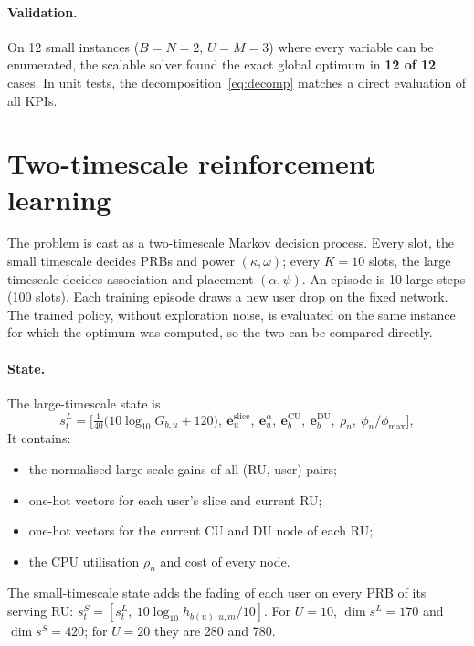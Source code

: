 \documentclass[11pt,oneside]{report}
\begin{document}
\paragraph{Validation.}
On 12 small instances ($B=N=2$, $U=M=3$) where every variable can be enumerated, the scalable solver found the exact global optimum in \textbf{12 of 12} cases.
In unit tests, the decomposition~\eqref{eq:decomp} matches a direct evaluation of all KPIs.

\section{Two-timescale reinforcement learning}\label{sec:rl}
The problem is cast as a two-timescale Markov decision process. Every slot, the small timescale decides PRBs and power $(\kappa,\omega)$; every $K=10$ slots, the large timescale decides association and placement $(\alpha,\psi)$.
An episode is 10 large steps (100 slots).
Each training episode draws a new user drop on the fixed network.
The trained policy, without exploration noise, is evaluated on the same instance for which the optimum was computed, so the two can be compared directly.

\paragraph{State.}
The large-timescale state is
\begin{equation}\label{eq:sL}
	s^L_t=\Big[\tfrac{1}{40}\big(10\log_{10}G_{b,u}+120\big),\ \mathbf e^{\text{slice}}_u,\ \mathbf e^{\alpha}_u,\ \mathbf e^{\mathrm{CU}}_b,\ \mathbf e^{\mathrm{DU}}_b,\ \rho_n,\ \phi_n/\phi_{\max}\Big],
\end{equation}
It contains:
\begin{itemize}
	\item the normalised large-scale gains of all (RU, user) pairs;
	\item one-hot vectors for each user's slice and current RU;
	\item one-hot vectors for the current CU and DU node of each RU;
	\item the CPU utilisation $\rho_n$ and cost of every node.
\end{itemize}
The small-timescale state adds the fading of each user on every PRB of its serving RU: $s^S_t=[s^L_t,\ 10\log_{10}h_{b(u),u,m}/10]$.
For $U=10$, $\dim s^L=170$ and $\dim s^S=420$; for $U=20$ they are 280 and 780.
\end{document}
